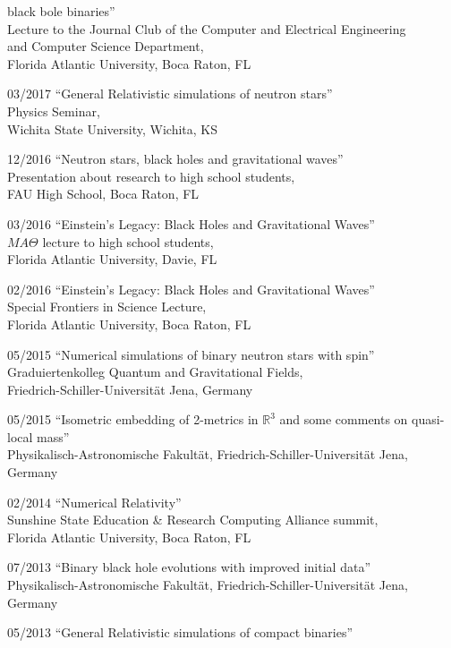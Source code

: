 \documentclass[11pt]{article}
\begin{document}
\begin{list}{}{\leftmargin=5em =1.5em \rightmargin=-8em =7em}
		black bole binaries''\\
		{Lecture to the Journal Club of the Computer and
		Electrical Engineering}\\
		{and Computer Science Department}, \\
		{Florida Atlantic University, Boca Raton, FL}
\item[03/2017]	``General Relativistic simulations of neutron stars''\\
		{Physics Seminar}, \\
		{Wichita State University, Wichita, KS}
\item[12/2016]	``Neutron stars, black holes and gravitational waves''\\
		{Presentation about research to high school students}, \\
		{FAU High School, Boca Raton, FL}
\item[03/2016]	``Einstein's Legacy: Black Holes and Gravitational Waves''\\
		{$MA\Theta$ lecture to high school students},\\
		{Florida Atlantic University, Davie, FL}
\item[02/2016]	``Einstein's Legacy: Black Holes and Gravitational Waves''\\
		{Special Frontiers in Science Lecture},\\
		{Florida Atlantic University, Boca Raton, FL}
\item[05/2015]	``Numerical simulations of binary neutron stars with spin''\\
		{Graduiertenkolleg Quantum and Gravitational Fields},\\
		{Friedrich-Schiller-Universit\"at Jena, Germany}
\item[05/2015]	``Isometric embedding of 2-metrics in $\mathbb{R}^3$
		  and some comments on quasi-local mass''\\
		{Physikalisch-Astronomische Fakult\"at},
		{Friedrich-Schiller-Universit\"at Jena, Germany}
\item[02/2014]	``Numerical Relativity''\\
		{Sunshine State Education \& Research Computing Alliance
		summit},\\
		{Florida Atlantic University, Boca Raton, FL}
\item[07/2013]	``Binary black hole evolutions with improved initial data''\\
		{Physikalisch-Astronomische Fakult\"at},
		{Friedrich-Schiller-Universit\"at Jena, Germany}
\item[05/2013]	``General Relativistic simulations of compact binaries''\\

\end{list}
\end{document}
